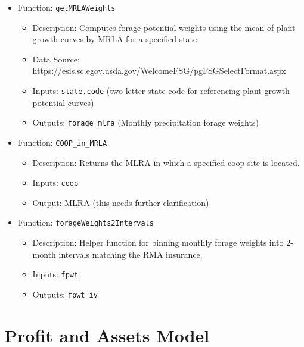 \documentclass[11pt]{article}
\begin{document}
\begin{itemize}
\item Function: \verb!getMRLAWeights!
	\begin{itemize}
	\item Description: Computes forage potential weights using the mean of plant growth curves by MRLA for a specified state.
	\item Data Source: https://esis.sc.egov.usda.gov/WelcomeFSG/pgFSGSelectFormat.aspx
	\item Inputs: \verb!state.code! (two-letter state code for referencing
  plant growth potential curves)
  \item Outputs: \verb!forage_mlra! (Monthly precipitation forage weights)
	\end{itemize}
\end{itemize}

\begin{itemize}
\item Function: \verb!COOP_in_MRLA!
	\begin{itemize}
	\item Description: Returns the MLRA in which a specified coop site is located.
	\item Inputs: \verb!coop!
	\item Output: MLRA (this needs further clarification)
	\end{itemize}
\end{itemize}

\begin{itemize}
\item Function: \verb!forageWeights2Intervals!
	\begin{itemize}
	\item Description: Helper function for binning monthly forage weights into 2-month intervals matching the RMA insurance.
	\item Inputs: \verb!fpwt!
	\item Outputs: \verb!fpwt_iv!
	\end{itemize}
\end{itemize}

\section{Profit and Assets Model}
\end{document}

